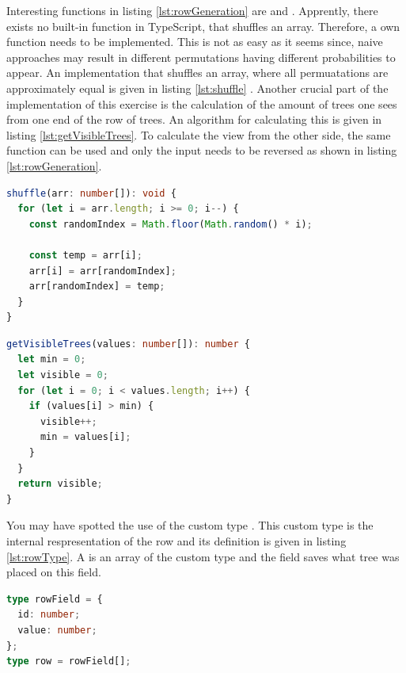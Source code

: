 Interesting functions in listing \ref{lst:rowGeneration} are  and . Apprently, there exists no built-in function in TypeScript, that shuffles an array. Therefore, a own function needs to be implemented. This is not as easy as it seems since, naive approaches may result in different permutations having different probabilities to appear. An implementation that shuffles an array, where all permuatations are approximately equal is given in listing \ref{lst:shuffle} \cite{JavaScriptShuffle}.
Another crucial part of the implementation of this exercise is the calculation of the amount of trees one sees from one end of the row of trees. An algorithm for calculating this is given in listing \ref{lst:getVisibleTrees}. To calculate the view from the other side, the same function can be used and only the input needs to be reversed as shown in listing \ref{lst:rowGeneration}.

\begin{lstlisting}[language=TypeScript,caption={Algorithm to shuffle an array},label={lst:shuffle}]
shuffle(arr: number[]): void {
  for (let i = arr.length; i >= 0; i--) {
    const randomIndex = Math.floor(Math.random() * i);

    const temp = arr[i];
    arr[i] = arr[randomIndex];
    arr[randomIndex] = temp;
  }
}
\end{lstlisting}

\begin{lstlisting}[language=TypeScript,caption={Algorithm to calculate the amount of visible tree from one end},label={lst:getVisibleTrees}]
getVisibleTrees(values: number[]): number {
  let min = 0;
  let visible = 0;
  for (let i = 0; i < values.length; i++) {
    if (values[i] > min) {
      visible++;
      min = values[i];
    }
  }
  return visible;
}
\end{lstlisting}

You may have spotted the use of the custom type . This custom type is the internal respresentation of the row and its definition is given in listing \ref{lst:rowType}. A  is an array of the custom type  and the field  saves what tree was placed on this field.

\begin{lstlisting}[language=TypeScript,caption={Definition of the custom row and rowField type},label={lst:rowType}]
type rowField = {
  id: number;
  value: number;
};
type row = rowField[];
\end{lstlisting}

